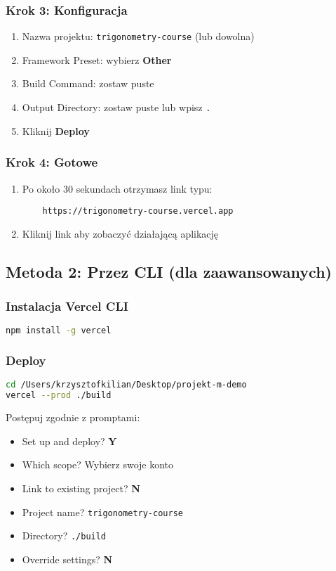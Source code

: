 \documentclass[12pt,a4paper]{article}
\begin{document}
\subsubsection{Krok 3: Konfiguracja}
\begin{enumerate}
    \item Nazwa projektu: \texttt{trigonometry-course} (lub dowolna)
    \item Framework Preset: wybierz \textbf{Other}
    \item Build Command: zostaw puste
    \item Output Directory: zostaw puste lub wpisz \texttt{.}
    \item Kliknij \textbf{Deploy}
\end{enumerate}

\subsubsection{Krok 4: Gotowe}
\begin{enumerate}
    \item Po około 30 sekundach otrzymasz link typu:
    \begin{verbatim}
    https://trigonometry-course.vercel.app
    \end{verbatim}
    \item Kliknij link aby zobaczyć działającą aplikację
\end{enumerate}

\subsection{Metoda 2: Przez CLI (dla zaawansowanych)}

\subsubsection{Instalacja Vercel CLI}
\begin{lstlisting}[language=bash]
npm install -g vercel
\end{lstlisting}

\subsubsection{Deploy}
\begin{lstlisting}[language=bash]
cd /Users/krzysztofkilian/Desktop/projekt-m-demo
vercel --prod ./build
\end{lstlisting}

Postępuj zgodnie z promptami:
\begin{itemize}
    \item Set up and deploy? \textbf{Y}
    \item Which scope? Wybierz swoje konto
    \item Link to existing project? \textbf{N}
    \item Project name? \texttt{trigonometry-course}
    \item Directory? \texttt{./build}
    \item Override settings? \textbf{N}
\end{itemize}
\end{document}
